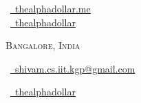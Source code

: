 \documentclass[a4paper,10pt]{extarticle} %
\begin{document}
\pagestyle{empty} %


\begin{multicols}{3}
\normalsize  \faGlobe\ {\href{https://thealphadollar.me/}{\  thealphadollar.me}}\\
\normalsize \faGithub\ {\href{https://github.com/thealphadollar}{\  thealphadollar}}\\
\columnbreak
\normalsize\par{\centering{\huge\textsc{\textcolor{primary}{Shivam Kumar Jha}}}\par} %
\par{\centering\normalsize {\textsc{Bangalore, India}}\hfill\par}
\columnbreak
\raggedright\hfill\normalsize \faEnvelope\ {\href{mailto:shivam.cs.iit.kgp@gmail.com}{\  shivam.cs.iit.kgp@gmail.com}}\\
\raggedright\hfill\normalsize \faLinkedinSquare\ {\href{https://www.linkedin.com/in/thealphadollar}{\  thealphadollar}}\\
\end{multicols}
\vspace{-0.4 cm}

\end{document}
